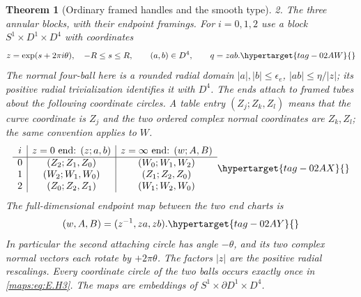 \documentclass[11pt,a4paper]{article}
\numberwithin{equation}{section}
\newtheorem{theorem}{Theorem}[section]
\theoremstyle{definition}
\begin{document}
\begin{theorem}[Ordinary framed handles and the smooth type]
\emph{2. The three annular blocks, with their endpoint framings.}
For $i=0,1,2$ use a block $S^1\times D^1\times D^4$ with coordinates
\begin{equation}
 z=\exp(s+2\pi i\theta),\quad -R\leq s\leq R,
 \qquad (a,b)\in D^4,\qquad q=zab.
 \hypertarget{tag-02AW}{}\label{maps:eq:E.H2}
\end{equation}
The normal four-ball here is a rounded radial domain
$|a|,|b|\leq\epsilon_e$, $|ab|\leq\eta/|z|$;
its positive radial trivialization identifies it with $D^4$.
The ends attach to framed tubes about the following coordinate
circles.  A table entry $(Z_j;Z_k,Z_l)$ means that the curve
coordinate is $Z_j$ and the two ordered complex normal coordinates
are $Z_k,Z_l$; the same convention applies to $W$.
\begin{equation}
\begin{array}{c|c|c}
 i&z=0\hbox{ end: }(z;a,b)&z=\infty\hbox{ end: }(w;A,B)\\ \hline
0&(Z_2;Z_1,Z_0)&(W_0;W_1,W_2)\\
1&(W_2;W_1,W_0)&(Z_1;Z_2,Z_0)\\
2&(Z_0;Z_2,Z_1)&(W_1;W_2,W_0)
\end{array}
\hypertarget{tag-02AX}{}\label{maps:eq:E.H3}
\end{equation}
The full-dimensional endpoint map between the two end charts is
\begin{equation}
                 (w,A,B)=(z^{-1},za,zb).
 \hypertarget{tag-02AY}{}\label{maps:eq:E.H4}
\end{equation}
In particular the second attaching circle has angle $-\theta$,
and its two complex normal vectors each rotate by $+2\pi\theta$.
The factors $|z|$ are the positive radial rescalings.
  Every coordinate circle
of the two balls occurs exactly once in \eqref{maps:eq:E.H3}.  The maps are
embeddings of $S^1\times\partial D^1\times D^4$.


\end{theorem}
\end{document}
